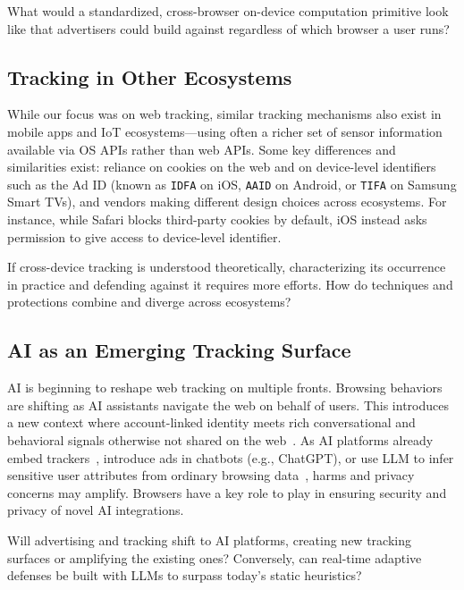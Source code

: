 \begin{opbox}
What would a standardized, cross-browser on-device computation primitive look like that advertisers could build against regardless of which browser a user runs?
\end{opbox}


\subsection{Tracking in Other Ecosystems}

While our focus was on web tracking, similar tracking mechanisms also exist in mobile apps and IoT ecosystems---using often a richer set of sensor information available via OS APIs rather than web APIs. Some key differences and similarities exist: reliance on cookies on the web and on device-level identifiers such as the Ad ID (known as \texttt{IDFA} on iOS, \texttt{AAID} on Android, or \texttt{TIFA} on Samsung Smart TVs), and vendors making different design choices across ecosystems. For instance, while Safari blocks third-party cookies by default, iOS instead asks permission to give access to device-level identifier.

\begin{opbox}
If cross-device tracking is understood theoretically, characterizing its occurrence in practice and defending against it requires more efforts. How do techniques and protections combine and diverge across ecosystems?
\end{opbox}


\subsection{AI as an Emerging Tracking Surface}

AI is beginning to reshape web tracking on multiple fronts.
%
Browsing behaviors are shifting as AI assistants navigate the web on behalf of users. This introduces a new context where account-linked identity meets rich conversational and behavioral signals otherwise not shared on the web~\cite{vekaria2025big}.
%
As AI platforms already embed trackers~\cite{jazlan2026tracking}, introduce ads in chatbots (e.g., ChatGPT), or use LLM to infer sensitive user attributes from ordinary browsing data~\cite{chenWhenAdsBecome2026}, harms and privacy concerns may amplify.
%
Browsers have a key role to play in ensuring security and privacy of novel AI integrations.

\begin{opbox}
Will advertising and tracking shift to AI platforms, creating new tracking surfaces or amplifying the existing ones? Conversely, can real-time adaptive defenses be built with LLMs to surpass today's static heuristics?
\end{opbox}
